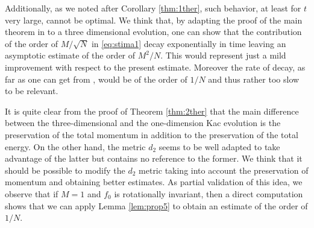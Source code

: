 \documentclass{article}
\newcommand\uxi{{\underline \xi}}
\newcommand\veta{{\vec \eta}}
\begin{document}
Additionally, as we noted after Corollary \ref{thm:1ther}, such behavior, at least for $t$ very large, cannot be
optimal. We think that, by adapting the proof of the main theorem in \cite{Hagop} to a three dimensional evolution, one
can show that the contribution of the order of $M/\sqrt{N}$ in \eqref{eq:stima1} decay exponentially in time leaving an
asymptotic estimate of the order of $M^2/N$. This would represent just a mild improvement with respect to the present
estimate. Moreover the rate of decay, as far as one can get from \cite{Hagop}, would be of the order of $1/N$ and thus
rather too slow to be relevant.

It is quite clear from the proof of Theorem \ref{thm:2ther} that the main difference between the three-dimensional and
the one-dimension Kac evolution is the preservation of the total momentum in addition to the preservation of the total
energy. On the other hand, the metric $d_2$ seems to be well adapted to take advantage of the latter but contains no
reference to the former. We think that it should be possible to modify the $d_2$ metric taking into account the
preservation of momentum and obtaining better estimates. As partial validation of this idea, we observe that if $M=1$
and $f_0$ is rotationally invariant, then a direct computation shows that 
we can apply Lemma \ref{lem:prop5} to obtain an estimate of the order of $1/N$.
 
\end{document}
